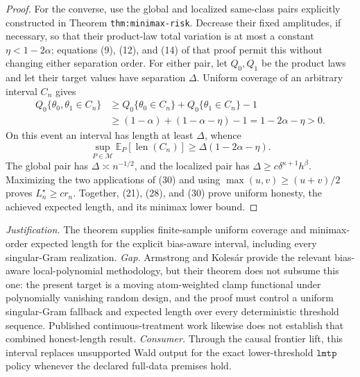 \documentclass{article}
\begin{document}
\begin{proof}
For the converse, use the global and localized same-class pairs explicitly constructed in Theorem \texttt{thm:minimax-risk}.  Decrease their fixed amplitudes, if necessary, so that their product-law total variation is at most a constant \(\eta<1-2\alpha\); equations (9), (12), and (14) of that proof permit this without changing either separation order.  For either pair, let \(Q_0,Q_1\) be the product laws and let their target values have separation \(\Delta\).  Uniform coverage of an arbitrary interval \(C_n\) gives
\[
 \begin{aligned}
 Q_0\{\theta_0,\theta_1\in C_n\}
 &\geq Q_0\{\theta_0\in C_n\}+Q_0\{\theta_1\in C_n\}-1\\
 &\geq(1-\alpha)+(1-\alpha-\eta)-1
 =1-2\alpha-\eta>0. 
 \end{aligned} \tag{29}
\]
On this event an interval has length at least \(\Delta\), whence
\[
 \sup_{P\in\mathcal M}\mathbb E_P[\operatorname{len}(C_n)]
 \geq\Delta(1-2\alpha-\eta). \tag{30}
\]
The global pair has \(\Delta\asymp n^{-1/2}\), and the localized pair has \(\Delta\geq c\delta^{\kappa+1}h^\beta\).  Maximizing the two applications of (30) and using \(\max(u,v)\geq(u+v)/2\) proves \(L_n^\star\geq cr_n\).  Together, (21), (28), and (30) prove uniform honesty, the achieved expected length, and its minimax lower bound.
\end{proof}
\par\smallskip\noindent \textit{Justification.} The theorem supplies finite-sample uniform coverage and minimax-order expected length for the explicit bias-aware interval, including every singular-Gram realization. \textit{Gap.} Armstrong and Kolesár provide the relevant bias-aware local-polynomial methodology, but their theorem does not subsume this one: the present target is a moving atom-weighted clamp functional under polynomially vanishing random design, and the proof must control a uniform singular-Gram fallback and expected length over every deterministic threshold sequence. Published continuous-treatment work likewise does not establish that combined honest-length result. \textit{Consumer.} Through the causal frontier lift, this interval replaces unsupported Wald output for the exact lower-threshold \(\texttt{lmtp}\) policy whenever the declared full-data premises hold.
\end{document}
